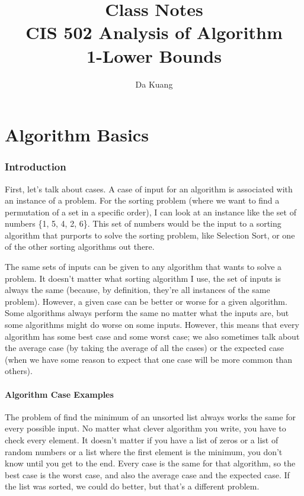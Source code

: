 \documentclass[en,hazy,blue,screen,14pt]{elegantnote}
\title{Class Notes\\CIS 502 Analysis of Algorithm\\1-Lower Bounds}
\author{Da Kuang}
\institute{University of Pennsylvania}
\date{}
\begin{document}
\maketitle
\newpage
\part{Algorithm Basics}

\section{Introduction}

First, let's talk about cases. A case of input for an algorithm is
associated with an instance of a problem. For the sorting problem
(where we want to find a permutation of a set in a specific order),
I can look at an instance like the set of numbers \{1, 5, 4, 2, 6\}.
This set of numbers would be the input to a sorting algorithm that
purports to solve the sorting problem, like Selection Sort, or one
of the other sorting algorithms out there. 

The same sets of inputs can be given to any algorithm that wants to
solve a problem. It doesn't matter what sorting algorithm I use, the
set of inputs is always the same (because, by definition, they're
all instances of the same problem). However, a given case can be better
or worse for a given algorithm. Some algorithms always perform the
same no matter what the inputs are, but some algorithms might do worse
on some inputs. However, this means that every algorithm has some
best case and some worst case; we also sometimes talk about the average
case (by taking the average of all the cases) or the expected case
(when we have some reason to expect that one case will be more common
than others).


\subsection{Algorithm Case Examples }

The problem of \textquotedbl find the minimum of an unsorted list\textquotedbl{}
always works the same for every possible input. No matter what clever
algorithm you write, you have to check every element. It doesn't matter
if you have a list of zeros or a list of random numbers or a list
where the first element is the minimum, you don't know until you get
to the end. Every case is the same for that algorithm, so the best
case is the worst case, and also the average case and the expected
case. If the list was sorted, we could do better, but that's a different
problem.
\end{document}
